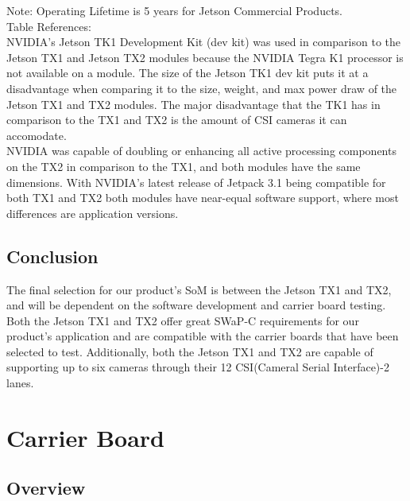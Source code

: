 \documentclass[letterpaper,10pt,serif,draftclsnofoot,onecolumn,compsoc,titlepage]{IEEEtran}
\begin{document}
\newline
\newline
\newline
Note: Operating Lifetime is 5 years for Jetson Commercial Products.\\
Table References: \cite{TK1Wiki, TK1Power, TK1Rev, JetsonFAQ, TegraK1, TK12Comp, JetsonGenius, TX1PS, TX2DS}\\

NVIDIA's Jetson TK1 Development Kit (dev kit) was used in comparison to the Jetson TX1 
and Jetson TX2 modules because the NVIDIA Tegra K1 processor is not available on a 
module. The size of the Jetson TK1 dev kit puts it at a 
disadvantage when comparing it to the size, weight, and max power draw of the Jetson 
TX1 and TX2 modules. The major disadvantage that the TK1 has in comparison to the TX1 
and TX2 is the amount of CSI cameras it can accomodate. \\

NVIDIA was capable of doubling or enhancing all active processing components on the 
TX2 in comparison to the TX1, and both modules have the same dimensions. With NVIDIA's 
latest release of Jetpack 3.1 being compatible for both TX1 and TX2 both modules 
have near-equal software support, where most differences are application 
versions\cite{TX1Wiki, TX2Wiki, JetPackRel}. \\  

\subsection{Conclusion}

The final selection for our product's SoM is between the Jetson TX1 and TX2, and will 
be dependent on the software development and carrier board testing. Both the 
Jetson TX1 and TX2 offer great SWaP-C requirements for our product's application and 
are compatible with the carrier boards that have been selected to test. Additionally, 
both the Jetson TX1 and TX2 are capable of supporting up to six cameras through their 
12 CSI(Cameral Serial Interface)-2 lanes. \\

\section{Carrier Board}

\subsection{Overview}
\end{document}

